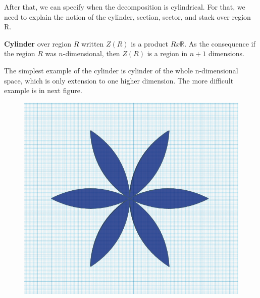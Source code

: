 \documentclass[
  digital, %
  twoside, %
  table,   %
  nolof,     %
  nolot,     %
]{fithesis3}
\begin{document}
 After that, we can specify when the decomposition is cylindrical. For that, we need to explain the notion of the cylinder, section, sector, and stack over region R.
\begin{definition}
\textbf{Cylinder} over region $R$ written $Z(R)$ is a product $R x \mathbb{R}$. As the consequence if the region $R$ was $n$-dimensional, then $Z(R)$ is a region in $n+1$ dimensions.
\end{definition}



The simplest example of the cylinder is cylinder of the whole n-dimensional space, which is only extension to one higher dimension. The more difficult example is in next figure.


\begin{figure}[H]
  \begin{center}
      \begin{minipage}{.4\textwidth}
          \includegraphics[width=\textwidth]{fithesis/images/flower2D.png}
    \end{minipage}
    \begin{minipage}{.4\textwidth}

\end{minipage}
\end{center}
\end{figure}
\end{document}
